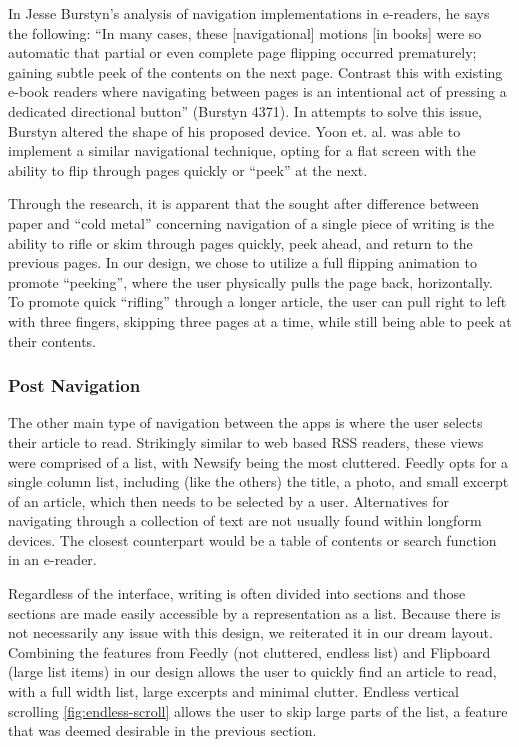 \documentclass[11pt, oneside]{article}   	%
\begin{document}
In Jesse Burstyn's analysis of navigation implementations in e-readers, he says the following: ``In many cases, these [navigational] motions [in books] were so automatic that partial or even complete page flipping occurred prematurely; gaining subtle peek of the contents on the next page. Contrast this with existing e-book readers where navigating between pages is an intentional act of pressing a dedicated directional button'' (Burstyn 4371). In attempts to solve this issue, Burstyn altered the shape of his proposed device. Yoon et. al. was able to implement a similar navigational technique, opting for a flat screen with the ability to flip through pages quickly or ``peek'' at the next.

Through the research, it is apparent that the sought after difference between paper and ``cold metal'' concerning navigation of a single piece of writing is the ability to rifle or skim through pages quickly, peek ahead, and return to the previous pages. In our design, we chose to utilize a full flipping animation to promote ``peeking'', where the user physically pulls the page back, horizontally. To promote quick ``rifling'' through a longer article, the user can pull right to left with three fingers, skipping three pages at a time, while still being able to peek at their contents.

\subsubsection{Post Navigation}
The other main type of navigation between the apps is where the user selects their article to read. Strikingly similar to web based RSS readers, these views were comprised of a list, with Newsify being the most cluttered. Feedly opts for a single column list, including (like the others) the title, a photo, and small excerpt of an article, which then needs to be selected by a user. Alternatives for navigating through a collection of text are not usually found within longform devices. The closest counterpart would be a table of contents or search function in an e-reader.

Regardless of the interface, writing is often divided into sections and those sections are made easily accessible by a representation as a list. Because there is not necessarily any issue with this design, we reiterated it in our dream layout. Combining the features from Feedly (not cluttered, endless list) and Flipboard (large list items) in our design allows the user to quickly find an article to read, with a full width list, large excerpts and minimal clutter. Endless vertical scrolling \ref{fig:endless-scroll} allows the user to skip large parts of the list, a feature that was deemed desirable in the previous section.
\end{document}
